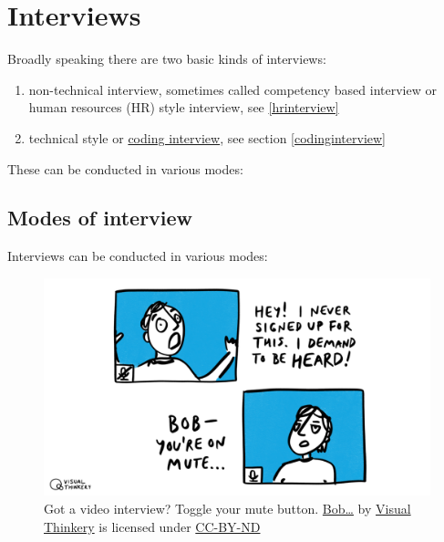 \documentclass[
]{book}
\providecommand{\tightlist}{%
  \setlength{\itemsep}{0pt}\setlength{\parskip}{0pt}}
\begin{document}
\hypertarget{interviews}{%
\section{Interviews}\label{interviews}}

Broadly speaking there are two basic kinds of interviews:

\begin{enumerate}
\def\labelenumi{\arabic{enumi}.}
\tightlist
\item
  non-technical interview, sometimes called competency based interview or human resources (HR) style interview, see \ref{hrinterview}
\item
  technical style or \href{https://en.wikipedia.org/wiki/Coding_interview}{coding interview}, see section \ref{codinginterview}
\end{enumerate}

These can be conducted in various modes:

\hypertarget{mode}{%
\subsection{Modes of interview}\label{mode}}

Interviews can be conducted in various modes:

\begin{figure}

{\centering \includegraphics[width=1\linewidth]{images/bob-youre-on-mute} 

}

\caption{Got a video interview? Toggle your mute button. \href{https://bryanmmathers.com/bob/}{Bob\ldots{}} by \href{https://visualthinkery.com/}{Visual Thinkery} is licensed under \href{https://creativecommons.org/licenses/by-nd/4.0/}{CC-BY-ND}}\label{fig:bobonmute-fig}
\end{figure}
\end{document}
